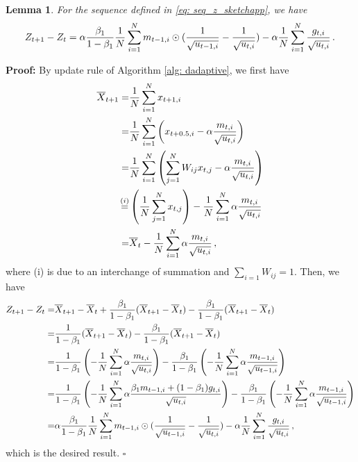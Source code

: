 \documentclass[11pt]{article}
\newtheorem{lemma}{Lemma}
\begin{document}
 \begin{lemma}\label{lem: z_diff} 
	For the sequence defined in \eqref{eq: seq_z_sketchapp}, we have
	\begin{align}\notag
	Z_{t+1} - Z_t = \alpha \frac{\beta_1}{1-\beta_1}  \frac{1}{N} \sum_{i=1}^N m_{t-1	,i} \odot (\frac{1}{\sqrt{u_{t-1,i}}} - \frac{1}{\sqrt{u_{t,i}}}) 
	- \alpha \frac{1}{N} \sum_{i=1}^N \frac{g_{t,i}}{\sqrt{u_{t,i}}} \, .
	\end{align}
\end{lemma}


\textbf{Proof:} By update rule of Algorithm \ref{alg: dadaptive}, we first have
\begin{align}\notag
\begin{split}
\overline X_{t+1}  = & \frac{1}{N}\sum_{i=1}^N x_{t+1,i}  \\
= & \frac{1}{N}\sum_{i=1}^N \left( x_{t+0.5,i} - \alpha \frac{m_{t,i}}{\sqrt{u_{t,i}}}\right)  \\
= & \frac{1}{N}\sum_{i=1}^N \left(  \sum_{j=1}^N W_{ij}x_{t,j} - \alpha \frac{m_{t,i}}{\sqrt{u_{t,i}}}\right)    \\
\overset{(i)}{=} &  \left(\frac{1}{N} \sum_{j=1}^N x_{t,j} \right) -\frac{1}{N} \sum_{i=1}^N   \alpha \frac{m_{t,i}}{\sqrt{u_{t,i}}}  \\
= & \overline X_t - \frac{1}{N} \sum_{i=1}^N   \alpha \frac{m_{t,i}}{\sqrt{u_{t,i}}} \, ,
\end{split}
\end{align}
where (i) is due to an interchange of summation and $\sum_{i=1} W_{ij} = 1$.
Then, we have 
\begin{align}\notag
\begin{split}
Z_{t+1} - Z_t =& \overline X_{t+1} - \overline X_{t} + \frac{\beta_1}{1-\beta_1} (\overline X_{t+1}- \overline X_t) - \frac{\beta_1}{1-\beta_1} (\overline X_{t+1}- \overline X_t)  \\
= &  \frac{1}{1-\beta_1} (\overline X_{t+1}- \overline X_t) - \frac{\beta_1}{1-\beta_1} (\overline X_{t+1}- \overline X_t)  \\
= & \frac{1}{1-\beta_1} \left(- \frac{1}{N} \sum_{i=1}^N   \alpha \frac{m_{t,i}}{\sqrt{u_{t,i}}}\right) - \frac{\beta_1}{1-\beta_1} \left(- \frac{1}{N} \sum_{i=1}^N   \alpha \frac{m_{t-1,i}}{\sqrt{u_{t-1,i}}}\right)  \\
= & \frac{1}{1-\beta_1} \left(- \frac{1}{N} \sum_{i=1}^N   \alpha \frac{\beta_1 m_{t-1,i} + (1-\beta_1) g_{t,i}}{\sqrt{u_{t,i}}}\right) - \frac{\beta_1}{1-\beta_1} \left(- \frac{1}{N} \sum_{i=1}^N   \alpha \frac{m_{t-1,i}}{\sqrt{u_{t-1,i}}}\right)  \\
= & \alpha \frac{\beta_1}{1-\beta_1}  \frac{1}{N} \sum_{i=1}^N m_{t-1	,i} \odot (\frac{1}{\sqrt{u_{t-1,i}}} - \frac{1}{\sqrt{u_{t,i}}}) - \alpha \frac{1}{N} \sum_{i=1}^N \frac{g_{t,i}}{\sqrt{u_{t,i}}} \, ,
\end{split}
\end{align}
which is the desired result. \hfill $\square$
\end{document}
